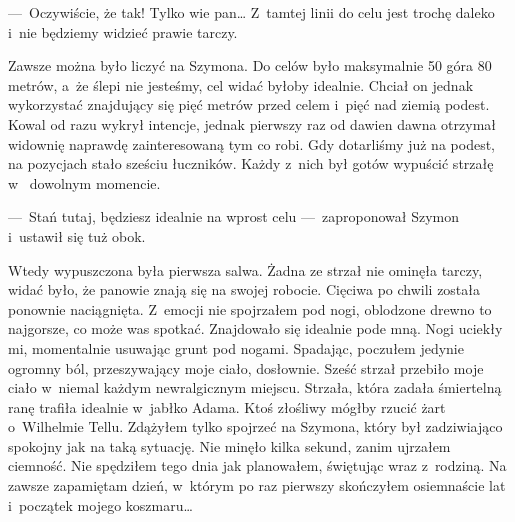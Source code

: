 ---~Oczywiście, że tak! Tylko wie pan… Z~tamtej linii do celu jest trochę daleko i~nie będziemy widzieć prawie tarczy.

Zawsze można było liczyć na Szymona. Do celów było maksymalnie 50 góra 80 metrów, a~że ślepi nie jesteśmy, cel widać 
byłoby idealnie. Chciał on jednak wykorzystać znajdujący się pięć metrów przed celem i~pięć nad ziemią podest. Kowal 
od razu wykrył intencje, jednak pierwszy raz od dawien dawna otrzymał widownię naprawdę zainteresowaną tym co robi.
Gdy dotarliśmy już na podest, na pozycjach stało sześciu łuczników. Każdy z~nich był gotów wypuścić strzałę w~
dowolnym momencie.

---~Stań tutaj, będziesz idealnie na wprost celu ---~zaproponował Szymon i~ustawił się tuż obok.

Wtedy wypuszczona była pierwsza salwa. Żadna ze strzał nie ominęła tarczy, widać było, że panowie znają się na swojej 
robocie. Cięciwa po chwili została ponownie naciągnięta. Z~emocji nie spojrzałem pod nogi, oblodzone drewno to 
najgorsze, co może was spotkać. Znajdowało się idealnie pode mną. Nogi uciekły mi, momentalnie usuwając grunt pod 
nogami. Spadając, poczułem jedynie ogromny ból, przeszywający moje ciało, dosłownie. Sześć strzał przebiło moje ciało 
w~niemal każdym newralgicznym miejscu. Strzała, która zadała śmiertelną ranę trafiła idealnie w~jabłko Adama. Ktoś 
złośliwy mógłby rzucić żart o~Wilhelmie Tellu. Zdążyłem tylko spojrzeć na Szymona, który był zadziwiająco spokojny 
jak na taką sytuację. Nie minęło kilka sekund, zanim ujrzałem ciemność. Nie spędziłem tego dnia jak planowałem, 
świętując wraz z~rodziną. Na zawsze zapamiętam dzień, w~którym po raz pierwszy skończyłem osiemnaście lat i~początek 
mojego koszmaru…
